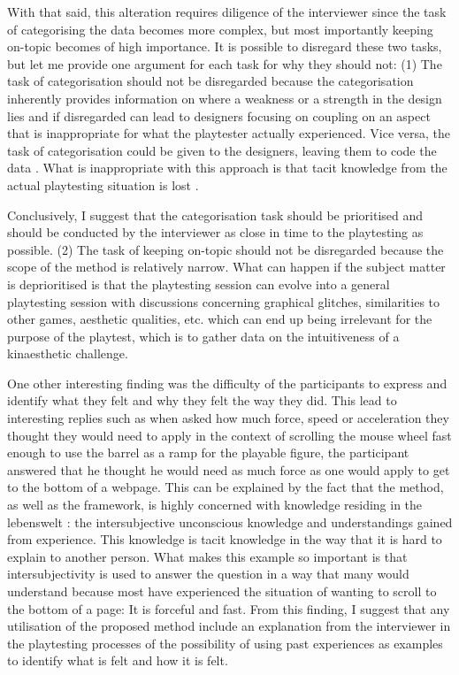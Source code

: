 With that said, this alteration requires diligence of the interviewer since the task of categorising the data becomes more complex, but most importantly keeping on-topic becomes of high importance. It is possible to disregard these two tasks, but let me provide one argument for each task for why they should not: (1) The task of categorisation should not be disregarded because the categorisation inherently provides information on where a weakness or a strength in the design lies and if disregarded can lead to designers focusing on coupling on an aspect that is inappropriate for what the playtester actually experienced. Vice versa, the task of categorisation could be given to the designers, leaving them to code the data \cite{cresswell}. What is inappropriate with this approach is that tacit knowledge from the actual playtesting situation is lost \cite{cresswell}.

Conclusively, I suggest that the categorisation task should be prioritised and should be conducted by the interviewer as close in time to the playtesting as possible. (2) The task of keeping on-topic should not be disregarded because the scope of the method is relatively narrow. What can happen if the subject matter is deprioritised is that the playtesting session can evolve into a general playtesting session with discussions concerning graphical glitches, similarities to other games, aesthetic qualities, etc. which can end up being irrelevant for the purpose of the playtest, which is to gather data on the intuitiveness of a kinaesthetic challenge.

One other interesting finding was the difficulty of the participants to express and identify what they felt and why they felt the way they did. This lead to interesting replies such as when asked how much force, speed or acceleration they thought they would need to apply in the context of scrolling the mouse wheel fast enough to use the barrel as a ramp for the playable figure, the participant answered that he thought he would need as much force as one would apply to get to the bottom of a webpage. This can be explained by the fact that the method, as well as the framework, is highly concerned with knowledge residing in the lebenswelt \cite{dourish}: the intersubjective unconscious knowledge and understandings gained from experience. This knowledge is tacit knowledge in the way that it is hard to explain to another person. What makes this example so important is that intersubjectivity is used to answer the question in a way that many would understand because most have experienced the situation of wanting to scroll to the bottom of a page: It is forceful and fast. From this finding, I suggest that any utilisation of the proposed method include an explanation from the interviewer in the playtesting processes of the possibility of using past experiences as examples to identify what is felt and how it is felt.

